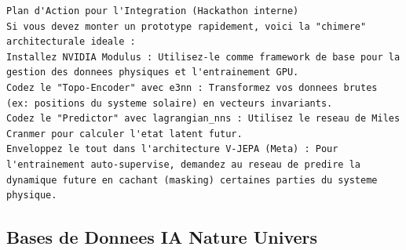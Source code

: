 \documentclass[11pt,a4paper]{article}
\begin{document}
\begin{lstlisting}[language={}, caption={}, basicstyle=\ttfamily\footnotesize, breaklines=true]
 Plan d'Action pour l'Integration (Hackathon interne)
Si vous devez monter un prototype rapidement, voici la "chimere" architecturale ideale :
Installez NVIDIA Modulus : Utilisez-le comme framework de base pour la gestion des donnees physiques et l'entrainement GPU.
Codez le "Topo-Encoder" avec e3nn : Transformez vos donnees brutes (ex: positions du systeme solaire) en vecteurs invariants.
Codez le "Predictor" avec lagrangian_nns : Utilisez le reseau de Miles Cranmer pour calculer l'etat latent futur.
Enveloppez le tout dans l'architecture V-JEPA (Meta) : Pour l'entrainement auto-supervise, demandez au reseau de predire la dynamique future en cachant (masking) certaines parties du systeme physique.

\end{lstlisting}

\subsection{Bases de Donnees IA Nature Univers}
\end{document}
